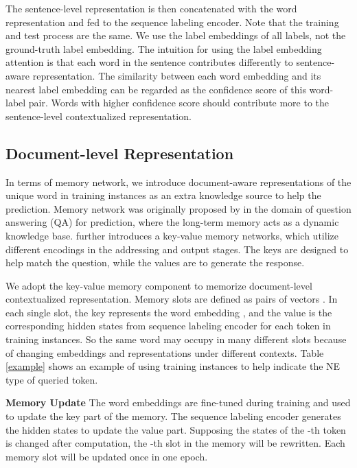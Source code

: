 \documentclass[letterpaper]{article} \usepackage{aaai20}  \usepackage{times}  \usepackage{helvet} \usepackage{courier}  \usepackage[hyphens]{url}  \usepackage{graphicx} \urlstyle{rm} \def\UrlFont{\rm}  \usepackage{graphicx}  \frenchspacing  \setlength{\pdfpagewidth}{8.5in}  \setlength{\pdfpageheight}{11in}
\begin{document}
The sentence-level representation  is then concatenated with the word representation  and fed to the sequence labeling encoder.
Note that the training and test process are the same. We use the label embeddings  of all labels, not the ground-truth label embedding.
The intuition for using the label embedding attention is that each word in the sentence contributes differently to sentence-aware representation. The similarity between each word embedding and its nearest label embedding can be regarded as the confidence score of this word-label pair. Words with higher confidence score should contribute more to the sentence-level contextualized representation. 

 
\subsection{Document-level Representation} 

In terms of memory network, we introduce document-aware representations of the unique word in training instances as an extra knowledge source to help the prediction.  Memory network was originally proposed by \cite{weston2014memory} in the domain of question answering (QA) for prediction, where the long-term memory acts as a dynamic knowledge base.
\cite{miller2016key} further introduces a key-value memory networks, which utilize different encodings in the addressing and output stages. The keys are designed to help match the question, while the values are to generate the response. 

We adopt the key-value memory component   to memorize document-level contextualized representation. 
Memory slots are defined as pairs of vectors .
In each single slot, the key represents the word embedding , and the value is the corresponding hidden states  from sequence labeling encoder for each token in training instances. So the same word may occupy in many different slots because of changing embeddings and representations under different contexts.
Table \ref{example} shows an example of using training instances to help indicate the NE type of queried token.

\noindent\textbf{Memory Update} 
The word embeddings are fine-tuned during training and used to update the key part of the memory. The sequence labeling encoder generates the hidden states to update the value part. Supposing the states of the -th token is changed after computation, the -th slot in the memory  will be rewritten.
Each memory slot will be updated once in one epoch.
\end{document}
